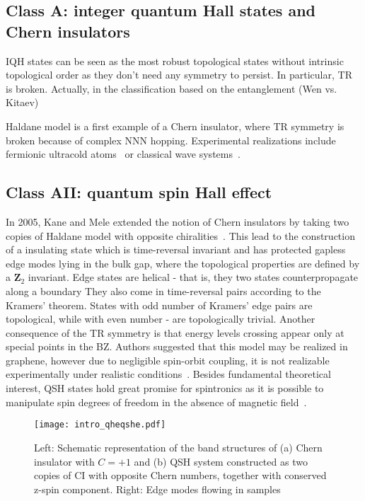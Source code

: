 {\subsection{Class A: integer quantum Hall states and Chern insulators}
IQH states can be seen as the most robust topological states without intrinsic topological order as they don't need any symmetry to persist. In particular, TR is broken. Actually, in the classification based on the entanglement (Wen vs. Kitaev)


Haldane model is a first example of a Chern insulator, where TR symmetry is broken because of complex NNN hopping. Experimental realizations include fermionic ultracold atoms~\cite{Jotzu2014} or classical wave systems~\cite{CIacustic2019}.

\clearpage


\subsection{Class AII: quantum spin Hall effect}
In 2005, Kane and Mele extended the notion of Chern insulators by taking two copies of Haldane model with opposite chiralities~\cite{KaneMeleGraphene}. This lead to the construction of a insulating state which is time-reversal invariant and has protected gapless edge modes lying in the bulk gap, where the topological properties are defined by a $\mathbf{Z}_2$ invariant. Edge states are helical - that is, they two states counterpropagate along a boundary They also come in time-reversal pairs according to the Kramers' theorem. States with odd number of Kramers' edge pairs are topological, while with even number - are topologically trivial. Another consequence of the TR symmetry is that energy levels crossing appear only at special points in the BZ. Authors suggested that this model may be realized in graphene, however due to negligible spin-orbit coupling, it is not realizable experimentally under realistic conditions~\cite{PhysRevB.74.165310, PhysRevB.75.041401}. Besides fundamental theoretical interest, QSH states hold great promise for spintronics as it is possible to manipulate spin degrees of freedom in the absence of magnetic field~\cite{RevModPhys.82.3045}.

\begin{figure}
\centering
\texttt{[image: intro\_qheqshe.pdf]}
\caption{Left: Schematic representation of the band structures of (a) Chern insulator with $C = +1$ and (b) QSH system constructed as two copies of CI with opposite Chern numbers, together with conserved z-spin component. Right: Edge modes flowing in samples}


\end{figure}}
